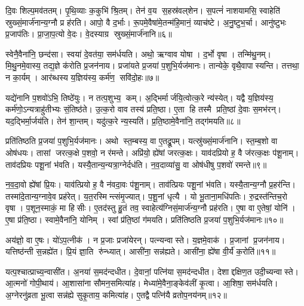 दि॒वः शिल्प॒मव॑ततम्। पृ॒थि॒व्याः क॒कुभि॑ श्रि॒तम्। तेन॑ व॒य स॒हस्र॑वल्‌शेन। स॒पत्नं॑ नाशयामसि॒ स्वाहेति॑ स्रुख्सं॒मार्ज॑नान्य॒ग्नौ प्र ह॑रति। आपो॒ वै द॒र्भाः। रू॒पमे॒वैषा॑मे॒तन्म॑हि॒मानं॒ व्याच॑ष्टे। अ॒नु॒ष्टुभ॒र्चा। आनु॑ष्टुभः प्र॒जाप॑तिः। प्रा॒जा॒प॒त्यो वे॒दः। वे॒दस्याग्र स्रुख्सं॒मार्ज॑नानि॥६॥

स्वेनै॒वैना॑नि॒ छन्द॑सा। स्वया॑ दे॒वत॑या॒ सम॑र्धयति। अथो॒ ऋग्वाव योषा। द॒र्भो वृषा। तन्मि॑थु॒नम्। मि॒थु॒नमे॒वास्य॒ तद्य॒ज्ञे क॑रोति प्र॒जन॑नाय। प्रजा॑यते प्र॒जया॑ प॒शुभि॒र्यज॑मानः। तान्येके॒ वृथै॒वापास्यन्ति। तत्तथा॒ न का॒र्यम्। आर॑ब्धस्य य॒ज्ञिय॑स्य॒ कर्म॑ण॒ सवि॑दो॒हः॥७॥

यद्ये॑नानि प॒शवो॑ऽभि॒ तिष्ठे॑युः। न तत्प॒शुभ्य॒ कम्। अ॒द्भिर्मार्जयि॒त्वोत्क॒रे न्य॑स्येत्। यद्वै य॒ज्ञिय॑स्य॒ कर्म॑णो॒ऽन्यत्राहु॑तीभ्यः सं॒तिष्ठ॑ते। उ॒त्क॒रो वाव तस्य॑ प्रति॒ष्ठा। ए॒ता हि तस्मै प्रति॒ष्ठां दे॒वाः स॒मभ॑रन्। यद॒द्भिर्मा॒र्जय॑ति। तेन॑ शा॒न्तम्। यदु॑त्क॒रे न्य॒स्यति॑। प्र॒ति॒ष्ठामे॒वैना॑नि॒ तद्ग॑मयति॥८॥

प्रति॑तिष्ठति प्र॒जया॑ प॒शुभि॒र्यज॑मानः। अथो स्त॒म्बस्य॒ वा ए॒तद्रू॒पम्। यत्स्रु॑ख्सं॒मार्ज॑नानि। स्त॒म्ब॒शो वा ओष॑धयः। तासां जरत्क॒क्षे प॒शवो॒ न र॑मन्ते। अप्रि॑यो॒ ह्ये॑षां जरत्क॒क्षः। याव॑दप्रियो ह॒ वै ज॑रत्क॒क्षः प॑शू॒नाम्। ताव॑दप्रियः पशू॒नां भ॑वति। यस्यै॒तान्य॒न्यत्रा॒ग्नेर्दध॑ति। न॒व॒दाव्या॑सु॒ वा ओष॑धीषु प॒शवो॑ रमन्ते॥९॥

न॒व॒दा॒वो ह्ये॑षां प्रि॒यः। याव॑त्प्रियो ह॒ वै न॑वदा॒वः प॑शू॒नाम्। ताव॑त्प्रियः पशू॒नां भ॑वति। यस्यै॒तान्य॒ग्नौ प्र॒हर॑न्ति। तस्मा॑दे॒तान्य॒ग्नावे॒व प्रह॑रेत्। य॒त॒रस्मिन्त्संमृ॒ज्यात्। प॒शू॒नां धृत्यै। यो भू॒ताना॒मधि॑पतिः। रु॒द्रस्त॑न्तिच॒रो वृषा। प॒शून॒स्माकं॒ मा हिसीः। ए॒तद॑स्तु हु॒तं तव॒ स्वाहेत्य॑ग्निसं॒मार्ज॑न्य॒ग्नौ प्रह॑रति। ए॒षा वा ए॒तेषां॒ योनि॑। ए॒षा प्र॑ति॒ष्ठा। स्वामे॒वैना॑नि॒ योनिम्। स्वां प्र॑ति॒ष्ठां ग॑मयति। प्रति॑तिष्ठति प्र॒जया॑ प॒शुभि॒र्यज॑मानः॥१०॥

अय॑ज्ञो॒ वा ए॒षः। यो॑ऽप॒त्नीक॑। न प्र॒जाः प्रजा॑येरन्। पत्न्यन्वास्ते। य॒ज्ञमे॒वाक॑। प्र॒जानां प्र॒जन॑नाय। यत्तिष्ठ॑न्ती स॒न्नह्ये॑त। प्रि॒यं ज्ञा॒ति रु॑न्ध्यात्। आसी॑ना॒ सन्न॑ह्यते। आसी॑ना॒ ह्ये॑षा वी॒र्य॑॑ क॒रोति॑॥११॥

यत्प॒श्चात्प्राच्य॒न्वासी॑त। अ॒नया॑ स॒मद॑न्दधीत। दे॒वानां॒ पत्नि॑या स॒मद॑न्दधीत। देशाद्दक्षिण॒त उदी॒च्यन्वास्ते। आ॒त्मनो॑ गोपी॒थाय॑। आ॒शासा॑ना सौमन॒समित्या॑ह। मेध्या॑मे॒वैना॒ङ्केव॑लीं कृ॒त्वा। आ॒शिषा॒ सम॑र्धयति। अ॒ग्नेरनु॑व्रता भू॒त्वा सन्न॑ह्ये सुकृ॒ताय॒ कमित्या॑ह। ए॒तद्वै पत्नि॑यै व्रतोप॒नय॑नम्॥१२॥

